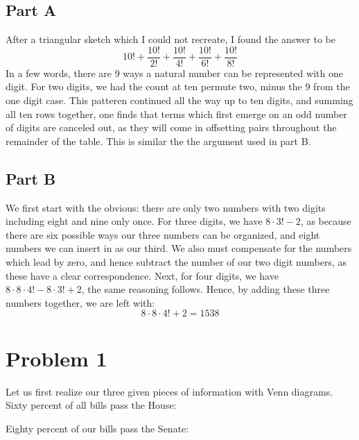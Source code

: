 \documentclass[12pt]{article}
\begin{document}
\subsection*{Part A}
After a triangular sketch which I could not recreate, I found the answer to be
\[
10! + \frac{10!}{2!} + \frac{10!}{4!} + \frac{10!}{6!} + \frac{10!}{8!}
\]
In a few words, there are 9 ways a natural number can be represented with one digit. For two digits, we had the count at ten permute two, minus the 9 from the one digit case. This patteren continued all the way up to ten digits, and summing all ten rows together, one finds that terms which first emerge on an odd number of digits are canceled out, as they will come in offsetting pairs throughout the remainder of the table. This is similar the the argument used in part B.


\subsection*{Part B}
We first start with the obvious: there are only two numbers with two digits including eight and nine only once. For three digits, we have $8 \cdot 3! - 2$, as because there are six possible ways our three numbers can be organized, and eight numbers we can insert in as our third. We also must compensate for the numbers which lead by zero, and hence subtract the number of our two digit numbers, as these have a clear correspondence. Next, for four digits, we have $8 \cdot 8 \cdot 4! -  8 \cdot 3! + 2$, the same reasoning follows. Hence, by adding these three numbers together, we are left with:
\[
8 \cdot 8 \cdot 4! + 2 = 1538
\]


\section*{Problem 1}

Let us first realize our three given pieces of information with Venn diagrams. Sixty percent of all bills pass the House:

\begin{center}
\end{center}

Eighty percent of our bills pass the Senate:
\end{document}
